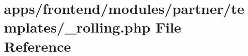 \hypertarget{frontend_2modules_2partner_2templates_2__rolling_8php}{\section{apps/frontend/modules/partner/templates/\-\_\-rolling.php File Reference}
\label{frontend_2modules_2partner_2templates_2__rolling_8php}
}

